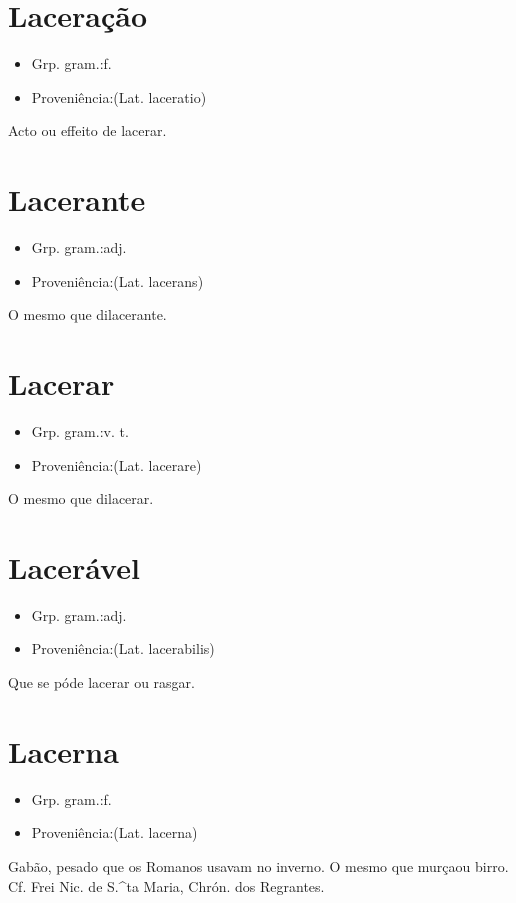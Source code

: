\section{Laceração}
\begin{itemize}
\item {Grp. gram.:f.}
\end{itemize}
\begin{itemize}
\item {Proveniência:(Lat. \textunderscore laceratio\textunderscore )}
\end{itemize}
Acto ou effeito de lacerar.
\section{Lacerante}
\begin{itemize}
\item {Grp. gram.:adj.}
\end{itemize}
\begin{itemize}
\item {Proveniência:(Lat. \textunderscore lacerans\textunderscore )}
\end{itemize}
O mesmo que \textunderscore dilacerante\textunderscore .
\section{Lacerar}
\begin{itemize}
\item {Grp. gram.:v. t.}
\end{itemize}
\begin{itemize}
\item {Proveniência:(Lat. \textunderscore lacerare\textunderscore )}
\end{itemize}
O mesmo que \textunderscore dilacerar\textunderscore .
\section{Lacerável}
\begin{itemize}
\item {Grp. gram.:adj.}
\end{itemize}
\begin{itemize}
\item {Proveniência:(Lat. \textunderscore lacerabilis\textunderscore )}
\end{itemize}
Que se póde lacerar ou rasgar.
\section{Lacerna}
\begin{itemize}
\item {Grp. gram.:f.}
\end{itemize}
\begin{itemize}
\item {Proveniência:(Lat. \textunderscore lacerna\textunderscore )}
\end{itemize}
Gabão, pesado que os Romanos usavam no inverno.
O mesmo que \textunderscore murça\textunderscore  ou \textunderscore birro\textunderscore . Cf. Frei Nic. de S.^ta Maria, \textunderscore Chrón. dos Regrantes\textunderscore .
